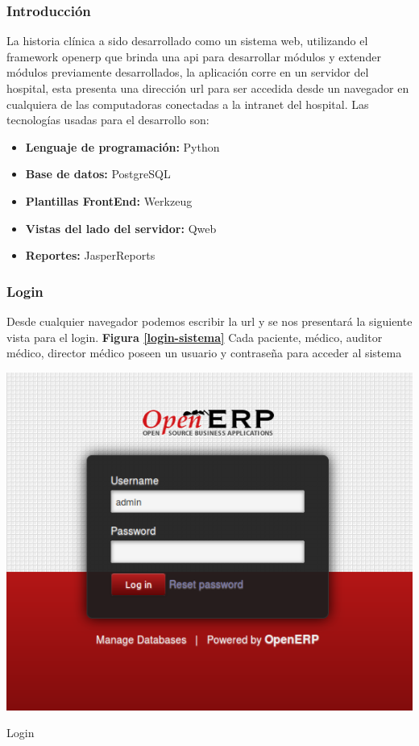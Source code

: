 {\correccionTexto
\subsubsection{Introducción}
La historia clínica a sido desarrollado como un sistema web,  utilizando el framework openerp que brinda una api para desarrollar módulos y extender módulos previamente desarrollados, la aplicación corre en un servidor del hospital, esta presenta una dirección url para ser accedida desde un navegador en cualquiera de las computadoras conectadas a la intranet del hospital. Las tecnologías usadas para el desarrollo son:

\begin{itemize}
	\item\textbf{Lenguaje de programación:} Python
    \item\textbf{Base de datos:} PostgreSQL
    \item\textbf{Plantillas FrontEnd:} Werkzeug
    \item\textbf{Vistas del lado del servidor:} Qweb
    \item\textbf{Reportes:} JasperReports
\end{itemize}

\subsubsection{Login}
Desde cualquier navegador podemos escribir la url y se nos presentará la siguiente vista para el login. \textbf{Figura \ref{login-sistema}}
Cada paciente, médico, auditor médico, director médico poseen un usuario y contraseña para acceder al sistema
}

\begin{correccionFigure}[h]
      \centering
      \includegraphics[width=.8\textwidth]{img/tp1/HE/Login}
      \caption{Login}
      \label{login-sistema}
\end{correccionFigure} 

